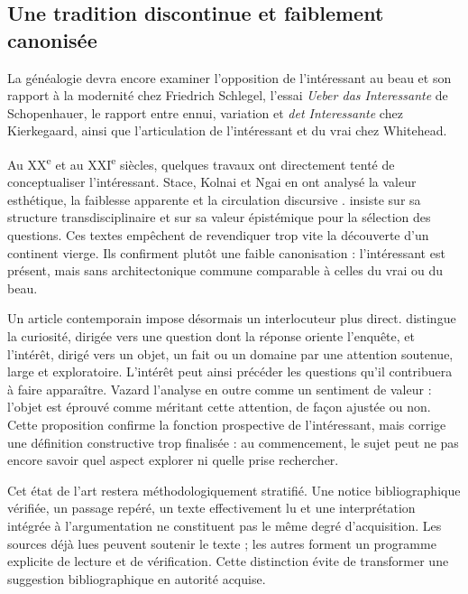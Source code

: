 \documentclass[11pt,a4paper]{article}
\begin{document}
\subsection{Une tradition discontinue et faiblement canonisée}

La généalogie devra encore examiner l'opposition de l'intéressant au beau et son
rapport à la modernité chez Friedrich Schlegel, l'essai \emph{Ueber das
Interessante} de Schopenhauer, le rapport entre ennui, variation et
\emph{det Interessante} chez Kierkegaard, ainsi que l'articulation de
l'intéressant et du vrai chez Whitehead.

Au XX\textsuperscript{e} et au XXI\textsuperscript{e} siècles, quelques travaux
ont directement tenté de conceptualiser l'intéressant. Stace, Kolnai et Ngai en
ont analysé la valeur esthétique, la faiblesse apparente et la circulation
discursive
\parencite{stace1944interestingness,kolnai1964concept,ngai2008merely,ngai2012categories}.
\textcite{epstein2009interesting} insiste sur sa structure transdisciplinaire et
\textcite{grimm2011interesting} sur sa valeur épistémique pour la sélection des
questions. Ces textes empêchent de revendiquer trop vite la découverte d'un
continent vierge. Ils confirment plutôt une faible canonisation : l'intéressant
est présent, mais sans architectonique commune comparable à celles du vrai ou du
beau.

Un article contemporain impose désormais un interlocuteur plus direct.
\textcite{vazard2026inquiry} distingue la curiosité, dirigée vers une question
dont la réponse oriente l'enquête, et l'intérêt, dirigé vers un objet, un fait ou
un domaine par une attention soutenue, large et exploratoire. L'intérêt peut
ainsi précéder les questions qu'il contribuera à faire apparaître. Vazard
l'analyse en outre comme un sentiment de valeur : l'objet est éprouvé comme
méritant cette attention, de façon ajustée ou non. Cette proposition confirme
la fonction prospective de l'intéressant, mais corrige une définition
constructive trop finalisée : au commencement, le sujet peut ne pas encore
savoir quel aspect explorer ni quelle prise rechercher.

Cet état de l'art restera méthodologiquement stratifié. Une notice
bibliographique vérifiée, un passage repéré, un texte effectivement lu et une
interprétation intégrée à l'argumentation ne constituent pas le même degré
d'acquisition. Les sources déjà lues peuvent soutenir le texte ; les autres
forment un programme explicite de lecture et de vérification. Cette distinction
évite de transformer une suggestion bibliographique en autorité acquise.
\end{document}
